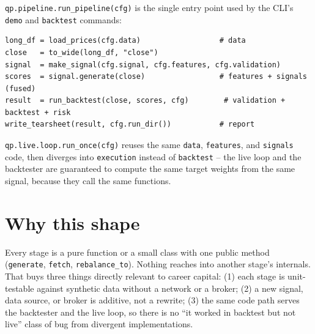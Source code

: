 \texttt{qp.pipeline.run\_pipeline(cfg)} is the single entry point used by the
CLI's \texttt{demo} and \texttt{backtest} commands:

\begin{lstlisting}
long_df = load_prices(cfg.data)                  # data
close   = to_wide(long_df, "close")
signal  = make_signal(cfg.signal, cfg.features, cfg.validation)
scores  = signal.generate(close)                 # features + signals (fused)
result  = run_backtest(close, scores, cfg)        # validation + backtest + risk
write_tearsheet(result, cfg.run_dir())           # report
\end{lstlisting}

\texttt{qp.live.loop.run\_once(cfg)} reuses the same \texttt{data}, \texttt{features},
and \texttt{signals} code, then diverges into \texttt{execution} instead of
\texttt{backtest} -- the live loop and the backtester are guaranteed to compute
the same target weights from the same signal, because they call the same
functions.

\section{Why this shape}

\begin{designnote}
Every stage is a pure function or a small class with one public method
(\texttt{generate}, \texttt{fetch}, \texttt{rebalance\_to}). Nothing reaches into
another stage's internals. That buys three things directly relevant to career
capital: (1) each stage is unit-testable against synthetic data without a
network or a broker; (2) a new signal, data source, or broker is additive, not
a rewrite; (3) the same code path serves the backtester and the live loop, so
there is no ``it worked in backtest but not live'' class of bug from divergent
implementations.
\end{designnote}
